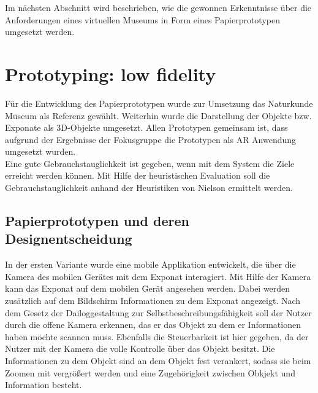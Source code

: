 \documentclass[runningheads,a4paper]{llncs}
\begin{document}





Im nächsten Abschnitt wird beschrieben, wie die gewonnen Erkenntnisse über die Anforderungen eines virtuellen Museums in Form eines Papierprototypen umgesetzt werden.\\

\section{Prototyping: low fidelity}
Für die Entwicklung des Papierprototypen wurde zur Umsetzung das Naturkunde Museum als Referenz gewählt. Weiterhin wurde die Darstellung der Objekte bzw. Exponate als 3D-Objekte umgesetzt.
Allen Prototypen gemeinsam ist, dass aufgrund der Ergebnisse der Fokusgruppe die Prototypen als AR Anwendung umgesetzt wurden.\\

Eine gute Gebrauchstauglichkeit ist gegeben, wenn mit dem System die Ziele erreicht werden können. Mit Hilfe der heuristischen Evaluation soll die Gebrauchstauglichkeit anhand der Heuristiken von Nielson ermittelt werden.\\
 
\subsection{Papierprototypen und deren Designentscheidung}
In der ersten Variante wurde eine mobile Applikation entwickelt, die über die Kamera des mobilen Gerätes mit dem Exponat interagiert. Mit Hilfe der Kamera kann das Exponat auf dem mobilen Gerät angesehen werden. Dabei werden zusätzlich auf dem Bildschirm  Informationen zu dem Exponat angezeigt. Nach dem Gesetz der Dailoggestaltung zur Selbstbeschreibungsfähigkeit soll der Nutzer durch die offene Kamera erkennen, das er das Objekt zu dem er Informationen haben möchte scannen muss. Ebenfalls die Steuerbarkeit ist hier gegeben, da der Nutzer mit der Kamera die volle Kontrolle über das Objekt besitzt. Die Informationen zu dem Objekt sind an dem Objekt fest verankert, sodass sie beim Zoomen mit vergrößert werden und eine Zugehörigkeit zwischen Obkjekt und Information besteht.\\
\end{document}

